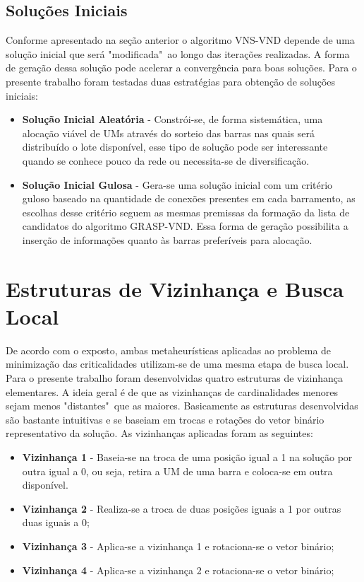 \documentclass[12pt]{article}
\begin{document}
\subsection{Soluções Iniciais}
Conforme apresentado na seção anterior o algoritmo VNS-VND depende de uma solução inicial que será "modificada"~ao longo das iterações realizadas. A forma de geração dessa solução pode acelerar a convergência para boas soluções. Para o presente trabalho foram testadas duas estratégias para obtenção de soluções iniciais:

\begin{itemize}
	\item \textbf{Solução Inicial Aleatória} - Constrói-se, de forma sistemática, uma alocação viável de UMs através do sorteio das barras nas quais será distribuído o lote disponível, esse tipo de solução pode ser interessante quando se conhece pouco da rede ou necessita-se de diversificação.
	
	\item \textbf{Solução Inicial Gulosa} - Gera-se uma solução inicial com um critério guloso baseado na quantidade de conexões presentes em cada barramento, as escolhas desse critério seguem as mesmas premissas da formação da lista de candidatos do algoritmo GRASP-VND. Essa forma de geração possibilita a inserção de informações quanto às barras preferíveis para alocação.
\end{itemize}
	


\section{Estruturas de Vizinhança e Busca Local}

De acordo com o exposto, ambas metaheurísticas aplicadas ao problema de minimização das criticalidades utilizam-se de uma mesma etapa de busca local. Para o presente trabalho foram desenvolvidas quatro estruturas de vizinhança elementares. A ideia geral é de que as vizinhanças de cardinalidades menores sejam menos "distantes"~que as maiores. Basicamente as estruturas desenvolvidas são bastante intuitivas e se baseiam em trocas e rotações do vetor binário representativo da solução. As vizinhanças aplicadas foram as seguintes:

\begin{itemize}
	\item \textbf{Vizinhança 1} - Baseia-se na troca de uma posição igual a 1 na solução por outra igual a 0, ou seja, retira a UM de uma barra e coloca-se em outra disponível.
	\item \textbf{Vizinhança 2} - Realiza-se a troca de duas posições iguais a 1 por outras duas iguais a 0;
	\item \textbf{Vizinhança 3} - Aplica-se a vizinhança 1 e rotaciona-se o vetor binário;
	\item \textbf{Vizinhança 4} - Aplica-se a vizinhança 2 e rotaciona-se o vetor binário;
\end{itemize}
\end{document}
